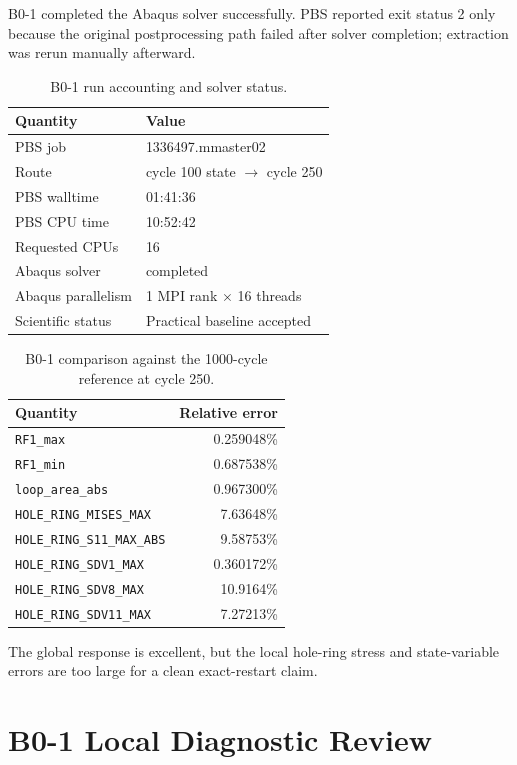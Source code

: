 \documentclass[11pt,a4paper]{article}
\newcommand{\code}[1]{\texttt{#1}}
\begin{document}
B0-1 completed the Abaqus solver successfully. PBS reported exit status 2 only because the original postprocessing path failed after solver completion; extraction was rerun manually afterward.

\begin{table}[H]
\centering
\caption{B0-1 run accounting and solver status.}
\begin{tabular}{ll}
\toprule
Quantity & Value \\
\midrule
PBS job & 1336497.mmaster02 \\
Route & cycle 100 state $\rightarrow$ cycle 250 \\
PBS walltime & 01:41:36 \\
PBS CPU time & 10:52:42 \\
Requested CPUs & 16 \\
Abaqus solver & completed \\
Abaqus parallelism & 1 MPI rank $\times$ 16 threads \\
Scientific status & Practical baseline accepted \\
\bottomrule
\end{tabular}
\end{table}

\begin{table}[H]
\centering
\caption{B0-1 comparison against the 1000-cycle reference at cycle 250.}
\begin{tabular}{lr}
\toprule
Quantity & Relative error \\
\midrule
\code{RF1\_max} & 0.259048\% \\
\code{RF1\_min} & 0.687538\% \\
\code{loop\_area\_abs} & 0.967300\% \\
\code{HOLE\_RING\_MISES\_MAX} & 7.63648\% \\
\code{HOLE\_RING\_S11\_MAX\_ABS} & 9.58753\% \\
\code{HOLE\_RING\_SDV1\_MAX} & 0.360172\% \\
\code{HOLE\_RING\_SDV8\_MAX} & 10.9164\% \\
\code{HOLE\_RING\_SDV11\_MAX} & 7.27213\% \\
\bottomrule
\end{tabular}
\end{table}

The global response is excellent, but the local hole-ring stress and state-variable errors are too large for a clean exact-restart claim.

\section{B0-1 Local Diagnostic Review}
\end{document}
